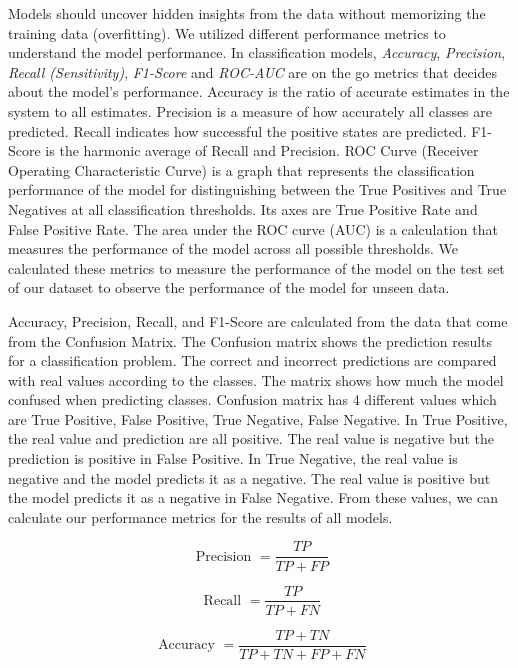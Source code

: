 \documentclass[12pt,oneandhalf,chaparabic,lfm,phd,eng,oneside,pntc]{gsufbe}
\begin{document}
Models should uncover hidden insights from the data without memorizing the training data (overfitting). We utilized different performance metrics to understand the model performance. In classification models, \textit{Accuracy}, \textit{Precision}, \textit{Recall (Sensitivity)}, \textit{F1-Score} and \textit{ROC-AUC} are on the go metrics that decides about the model's performance. Accuracy is the ratio of accurate estimates in the system to all estimates. Precision is a measure of how accurately all classes are predicted. Recall indicates how successful the positive states are predicted. F1-Score is the harmonic average of Recall and Precision. ROC Curve (Receiver Operating Characteristic Curve) \cite{hanley1982meaning} is a graph that represents the classification performance of the model for distinguishing between the True Positives and True Negatives at all classification thresholds. Its axes are True Positive Rate and False Positive Rate. The area under the ROC curve (AUC) is a calculation that measures the performance of the model across all possible thresholds. We calculated these metrics to measure the performance of the model on the test set of our dataset to observe the performance of the model for unseen data. 

Accuracy, Precision, Recall, and F1-Score are calculated from the data that come from the Confusion Matrix. The Confusion matrix shows the prediction results for a classification problem. The correct and incorrect predictions are compared with real values according to the classes. The matrix shows how much the model confused when predicting classes. Confusion matrix has 4 different values which are True Positive,  False Positive, True Negative, False Negative. In True Positive, the real value and prediction are all positive. The real value is negative but the prediction is positive in False Positive. In True Negative, the real value is negative and the model predicts it as a negative. The real value is positive but the model predicts it as a negative in False Negative. From these values, we can calculate our performance metrics for the results of all models. 

\begin{equation}
\text { Precision }=\frac{T P}{T P+F P}
\end{equation}

\begin{equation}
\text { Recall }=\frac{T P}{T P+F N}
\end{equation}

\begin{equation}
\text { Accuracy }=\frac{T P+T N}{T P+T N+F P+F N}
\end{equation}
\end{document}

